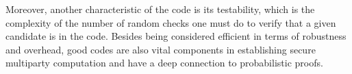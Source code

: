 Moreover, another characteristic of the code is its testability, which is the complexity of the number of random checks one must do to verify that a given candidate is in the code. Besides being considered efficient in terms of robustness and overhead, good codes are also vital components in establishing secure multiparty computation \cite{MultiParty} and have a deep connection to probabilistic proofs.

